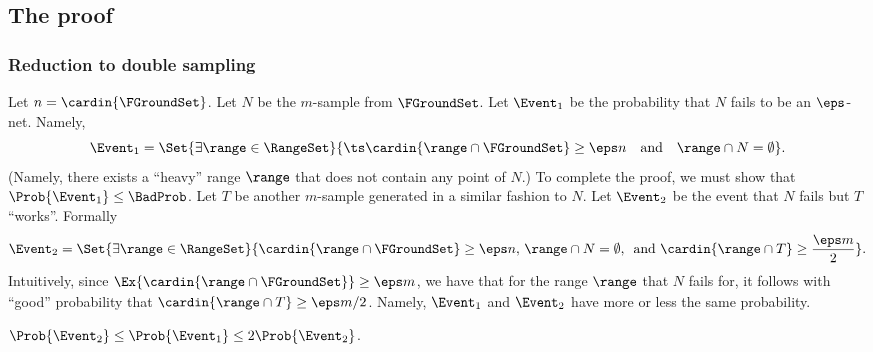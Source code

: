 \subsection{The proof}

\subsubsection{Reduction to double sampling}

Let $n = \cardin{\FGroundSet}$.  Let $N$ be the $m$-sample from
$\FGroundSet$.  Let $\Event_1$ be the probability that $N$ fails to be
an $\eps$-net.  Namely,
\begin{equation*}
    \Event_1%
    =%
    \Set{ \exists{\range \in \RangeSet} }{\bigl.\ts
       \cardin{\range \cap \FGroundSet} \geq \eps n \text{ ~ and ~
       } \range \cap N = \emptyset}.    
\end{equation*}
(Namely, there exists a ``heavy'' range $\range$ that does not contain
any point of $N$.)  To complete the proof, we must show that
$\Prob{\Event_1}\leq \BadProb$. Let $T$ be another $m$-sample
generated in a similar fashion to $N$. Let $\Event_2$ be the event
that $N$ fails but $T$ ``works''. Formally
\begin{equation*}
    \Event_2%
    =%
    \Set{\bigl. \exists{\range \in \RangeSet}}%
    {\bigl.\cardin{\range \cap \FGroundSet} \geq \eps n, \, \range \cap
       N = \emptyset, \, \text{ and } \cardin{\range \cap T} \geq
       \frac{\eps m}{2} }.
\end{equation*}
Intuitively, since
$\Ex{\bigl. \cardin{\range \cap \FGroundSet} } \geq \eps m$, we have
that for the range $\range$ that $N$ fails for, it follows with
``good'' probability that $\cardin{\range \cap T} \geq \eps m /
2$. Namely, $\Event_1$ and $\Event_2$ have more or less the same
probability.

\begin{claim}
    $\Prob{\Event_2} \leq \Prob{\Event_1} \leq 2\Prob{\Event_2}$.
\end{claim}

